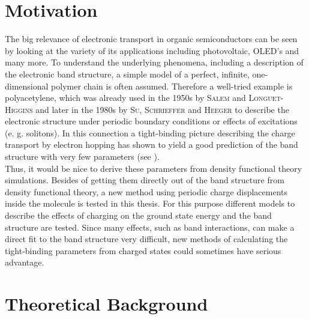 \section{Motivation}
The big relevance of electronic transport in organic semiconductors can be seen by looking at the variety of its applications including photovoltaic, OLED's and many more. To understand the underlying phenomena, including a description of the electronic band structure, a simple model of a perfect, infinite, one-dimensional polymer chain is often assumed. Therefore a well-tried example is polyacetylene, which was already used in the 1950s by \textsc{Salem} and \textsc{Longuet-Higgins} and later in the 1980s by \textsc{Su, Schrieffer} and \textsc{Heeger} to describe the electronic structure under periodic boundary conditions or effects of excitations (e. g. solitons). In this connection a tight-binding picture describing the charge transport by electron hopping has shown to yield a good prediction of the band structure with very few parameters (see \cite{koehler2015electronic,Longuet-Higgins172,PhysRevLett.42.1698}).\\
Thus, it would be nice to derive these parameters from density functional theory simulations. Besides of getting them directly out of the band structure from density functional theory, a new method using periodic charge displacements inside the molecule is tested in this thesis. For this purpose different models to describe the effects of charging on the ground state energy and the band structure are tested. Since many effects, such as band interactions, can make a direct fit to the band structure very difficult, new methods of calculating the tight-binding parameters from charged states could sometimes have serious advantage.

\section{Theoretical Background}

